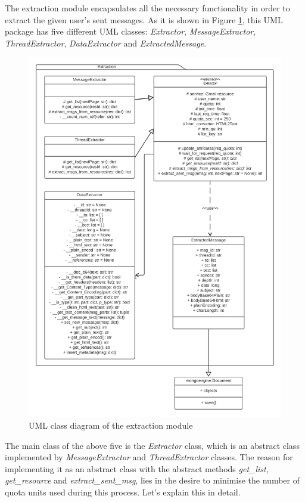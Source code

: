 The extraction module encapsulates all the necessary functionality in order to extract the given user's sent messages. As it is shown in Figure \ref{fig:umlext}, this UML package has five different UML classes: \textit{Extractor}, \textit{MessageExtractor}, \textit{ThreadExtractor}, \textit{DataExtractor} and \textit{ExtractedMessage}.

\begin{figure}[p]
	\centering%
	\centerline{\includegraphics[width=\textwidth]{Imagenes/Bitmap/Analyser/extractionUML.png}}%
	\caption{UML class diagram of the extraction module}%
	\label{fig:umlext}
\end{figure}


The main class of the above five is the \textit{Extractor} class, which is an abstract class implemented by \textit{MessageExtractor} and \textit{ThreadExtractor} classes. The reason for implementing it as an abstract class with the abstract methods \textit{get\_list}, \textit{get\_resource} and \textit{extract\_sent\_msg}, lies in the desire to minimise the number of quota units used during this process. Let's explain this in detail.

